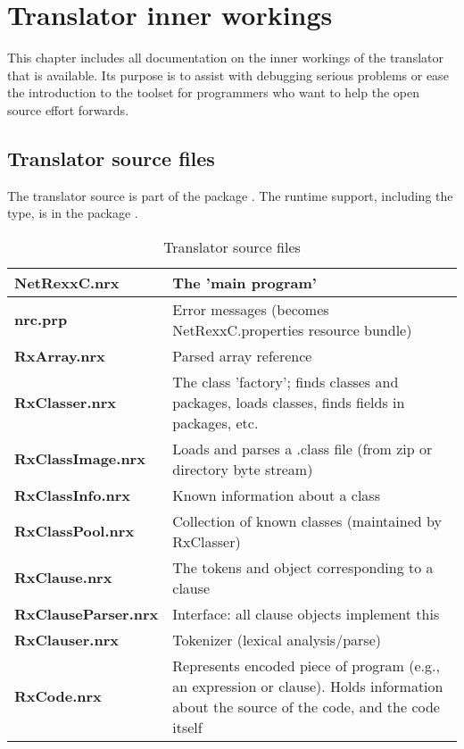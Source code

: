 {

\chapter{Translator inner workings}
This chapter includes all documentation on the inner workings of the
translator that is available. Its purpose is to assist with debugging
serious problems or ease the introduction to the toolset for
programmers who want to help the open source effort forwards.
\section{Translator source files}
The translator source is part of the package
. The runtime support, including the
 type, is in the package . 
\begin{table}\caption{Translator source files}
\begin{tabularx}{\textwidth}{>{\bfseries}lX}
\toprule
  NetRexxC.nrx        & The 'main program'
\\\midrule
  nrc.prp             & Error messages (becomes NetRexxC.properties
                         resource bundle)
\\\midrule
  RxArray.nrx         & Parsed array reference
\\\midrule
  RxClasser.nrx       & The class 'factory'; finds classes and
                         packages, loads classes, finds fields in
                         packages, etc.
\\\midrule
  RxClassImage.nrx    & Loads and parses a .class file (from zip or
                         directory byte stream)
\\\midrule
  RxClassInfo.nrx     & Known information about a class
\\\midrule
  RxClassPool.nrx     & Collection of known classes (maintained by
                         RxClasser)
\\\midrule
  RxClause.nrx        & The tokens and object corresponding to a
  clause
\\\midrule
  RxClauseParser.nrx  & Interface: all clause objects implement this
\\\midrule
  RxClauser.nrx       & Tokenizer (lexical analysis/parse)
\\\midrule
  RxCode.nrx          & Represents encoded piece of program (e.g., an
                         expression or clause).  Holds information about
                         the source of the code, and the code itself

\end{tabularx}
\end{table}}
